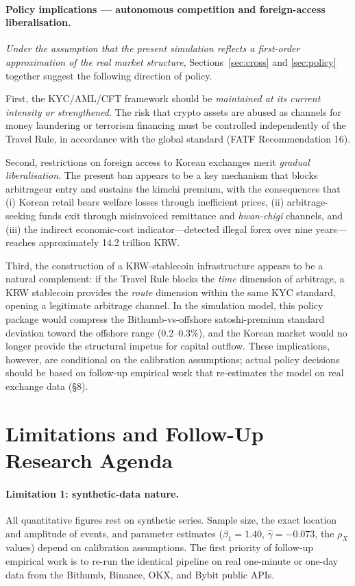 \documentclass[11pt,a4paper]{article}
\begin{document}
\paragraph{Policy implications --- autonomous competition and foreign-access liberalisation.}
\emph{Under the assumption that the present simulation reflects a first-order approximation of the
real market structure}, Sections~\ref{sec:cross} and \ref{sec:policy} together suggest the following
direction of policy.

First, the KYC/AML/CFT framework should be \emph{maintained at its current intensity or
strengthened}. The risk that crypto assets are abused as channels for money laundering or terrorism
financing must be controlled independently of the Travel Rule, in accordance with the global
standard (FATF Recommendation 16).

Second, restrictions on foreign access to Korean exchanges merit \emph{gradual liberalisation}.
The present ban appears to be a key mechanism that blocks arbitrageur entry and sustains the kimchi
premium, with the consequences that (i) Korean retail bears welfare losses through inefficient
prices, (ii) arbitrage-seeking funds exit through misinvoiced remittance and \emph{hwan-chigi}
channels, and (iii) the indirect economic-cost indicator---detected illegal forex over nine
years---reaches approximately 14.2 trillion KRW.

Third, the construction of a KRW-stablecoin infrastructure appears to be a natural complement:
if the Travel Rule blocks the \emph{time} dimension of arbitrage, a KRW stablecoin provides the
\emph{route} dimension within the same KYC standard, opening a legitimate arbitrage channel. In
the simulation model, this policy package would compress the Bithumb-vs-offshore satoshi-premium
standard deviation toward the offshore range (0.2--0.3\%), and the Korean market would no longer
provide the structural impetus for capital outflow. These implications, however, are conditional
on the calibration assumptions; actual policy decisions should be based on follow-up empirical
work that re-estimates the model on real exchange data (\S 8).

\section{Limitations and Follow-Up Research Agenda}

\paragraph{Limitation 1: synthetic-data nature.}
All quantitative figures rest on synthetic series. Sample size, the exact location and amplitude
of events, and parameter estimates ($\beta_1=1.40$, $\hat\gamma=-0.073$, the $\rho_X$ values) depend
on calibration assumptions. The first priority of follow-up empirical work is to re-run the
identical pipeline on real one-minute or one-day data from the Bithumb, Binance, OKX, and Bybit
public APIs.
\end{document}
